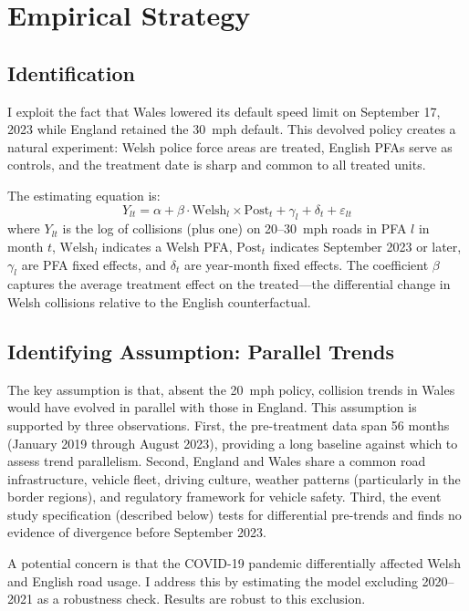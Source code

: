 \documentclass[12pt]{article}
\begin{document}
\section{Empirical Strategy}
\label{sec:strategy}

\subsection{Identification}

I exploit the fact that Wales lowered its default speed limit on September 17, 2023 while England retained the 30~mph default. This devolved policy creates a natural experiment: Welsh police force areas are treated, English PFAs serve as controls, and the treatment date is sharp and common to all treated units.

The estimating equation is:
\begin{equation}
\label{eq:did}
Y_{lt} = \alpha + \beta \cdot \text{Welsh}_l \times \text{Post}_t + \gamma_l + \delta_t + \varepsilon_{lt}
\end{equation}
where $Y_{lt}$ is the log of collisions (plus one) on 20--30~mph roads in PFA $l$ in month $t$, $\text{Welsh}_l$ indicates a Welsh PFA, $\text{Post}_t$ indicates September 2023 or later, $\gamma_l$ are PFA fixed effects, and $\delta_t$ are year-month fixed effects. The coefficient $\beta$ captures the average treatment effect on the treated---the differential change in Welsh collisions relative to the English counterfactual.

\subsection{Identifying Assumption: Parallel Trends}

The key assumption is that, absent the 20~mph policy, collision trends in Wales would have evolved in parallel with those in England. This assumption is supported by three observations. First, the pre-treatment data span 56 months (January 2019 through August 2023), providing a long baseline against which to assess trend parallelism. Second, England and Wales share a common road infrastructure, vehicle fleet, driving culture, weather patterns (particularly in the border regions), and regulatory framework for vehicle safety. Third, the event study specification (described below) tests for differential pre-trends and finds no evidence of divergence before September 2023.

A potential concern is that the COVID-19 pandemic differentially affected Welsh and English road usage. I address this by estimating the model excluding 2020--2021 as a robustness check. Results are robust to this exclusion.
\end{document}
